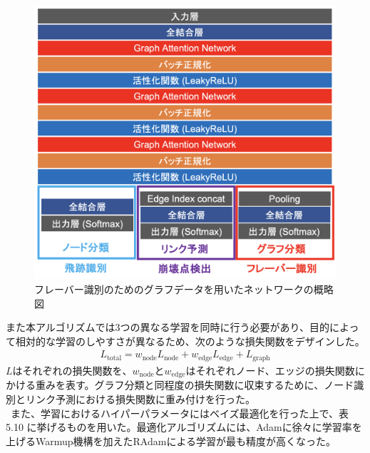 \begin{figure}[H]
	\begin{center}
 \includegraphics[keepaspectratio, scale=0.38]
 	{Figure/Flavortagging/gnn.png}
 		\caption{フレーバー識別のためのグラフデータを用いたネットワークの概略図}
 		\label{gnnmodel}
	\end{center}
\end{figure}
また本アルゴリズムでは3つの異なる学習を同時に行う必要があり、目的によって相対的な学習のしやすさが異なるため、次のような損失関数をデザインした。\\
\begin{align}
L_{\mathrm{total}} = w_{\mathrm{node}} L_{\mathrm{node}} + w_{\mathrm{edge}} L_{\mathrm{edge}} +  L_{\mathrm{graph}}
\end{align}
$L$はそれぞれの損失関数を、$w_\mathrm{{node}}とw_\mathrm{{edge}}$はそれぞれノード、エッジの損失関数にかける重みを表す。グラフ分類と同程度の損失関数に収束するために、ノード識別とリンク予測における損失関数に重み付けを行った。\\
\ また、学習におけるハイパーパラメータにはベイズ最適化を行った上で、表 5.10%
に挙げるものを用いた。最適化アルゴリズムには、Adamに徐々に学習率を上げるWarmup機構を加えたRAdamによる学習が最も精度が高くなった。

